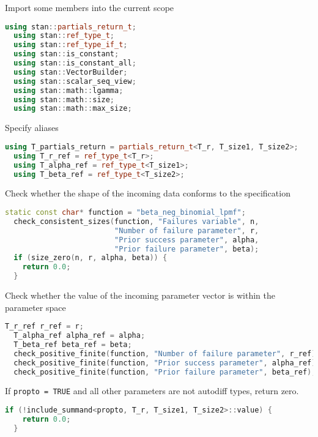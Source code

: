 \documentclass[11pt]{article}
\begin{document}
Import some members into the current scope
\begin{lstlisting}[language=c++, style=lgeneral]
  using stan::partials_return_t;
  using stan::ref_type_t;
  using stan::ref_type_if_t;
  using stan::is_constant;
  using stan::is_constant_all;
  using stan::VectorBuilder;
  using stan::scalar_seq_view;
  using stan::math::lgamma;
  using stan::math::size;
  using stan::math::max_size;	
\end{lstlisting}

Specify aliases
\begin{lstlisting}[language=c++, style=lgeneral]
  using T_partials_return = partials_return_t<T_r, T_size1, T_size2>;
  using T_r_ref = ref_type_t<T_r>;
  using T_alpha_ref = ref_type_t<T_size1>;
  using T_beta_ref = ref_type_t<T_size2>;
\end{lstlisting}



Check whether the shape of the incoming data conforms to the specification
\begin{lstlisting}[language=c++, style=lgeneral]
  static const char* function = "beta_neg_binomial_lpmf";
  check_consistent_sizes(function, "Failures variable", n,
                         "Number of failure parameter", r,
                         "Prior success parameter", alpha,
                         "Prior failure parameter", beta);
  if (size_zero(n, r, alpha, beta)) {
    return 0.0;
  }
\end{lstlisting}



Check whether the value of the incoming parameter vector is within the parameter space
\begin{lstlisting}[language=c++, style=lgeneral]
  T_r_ref r_ref = r;
  T_alpha_ref alpha_ref = alpha;
  T_beta_ref beta_ref = beta;
  check_positive_finite(function, "Number of failure parameter", r_ref);
  check_positive_finite(function, "Prior success parameter", alpha_ref);
  check_positive_finite(function, "Prior failure parameter", beta_ref);
\end{lstlisting}

If \verb|propto = TRUE| and all other parameters are not autodiff types, return zero.
\begin{lstlisting}[language=c++, style=lgeneral]
  if (!include_summand<propto, T_r, T_size1, T_size2>::value) {
    return 0.0;
  }
\end{lstlisting}
\end{document}
